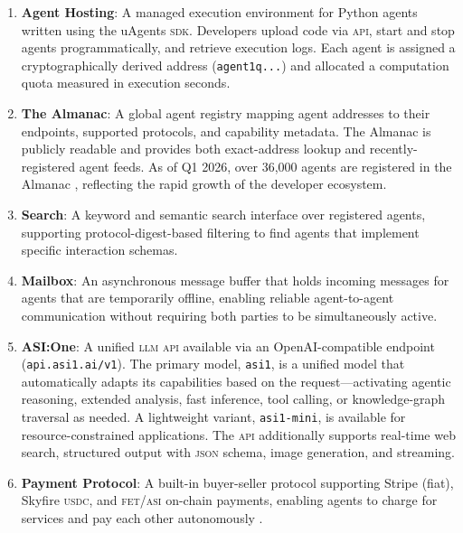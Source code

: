 \documentclass[twoside,11pt]{article}
\begin{document}
\begin{enumerate}[leftmargin=*]

\item \textbf{Agent Hosting}: A managed execution environment for Python agents
written using the uAgents \textsc{sdk}.  Developers upload code via
\textsc{api}, start and stop agents programmatically, and retrieve execution
logs.  Each agent is assigned a cryptographically derived address
(\texttt{agent1q...}) and allocated a computation quota measured in execution
seconds.

\item \textbf{The Almanac}: A global agent registry mapping agent addresses to
their endpoints, supported protocols, and capability metadata.  The Almanac is
publicly readable and provides both exact-address lookup and recently-registered
agent feeds.  As of Q1 2026, over 36,000 agents are registered in the Almanac
\citep{kantor2026stateofagents}, reflecting the rapid growth of the developer
ecosystem.

\item \textbf{Search}: A keyword and semantic search interface over registered
agents, supporting protocol-digest-based filtering to find agents that implement
specific interaction schemas.

\item \textbf{Mailbox}: An asynchronous message buffer that holds incoming
messages for agents that are temporarily offline, enabling reliable
agent-to-agent communication without requiring both parties to be simultaneously
active.

\item \textbf{ASI:One}: A unified \textsc{llm} \textsc{api} available via an
OpenAI-compatible endpoint (\texttt{api.asi1.\allowbreak{}ai/v1}).  The primary model,
\texttt{asi1}, is a unified model that automatically adapts its capabilities
based on the request---activating agentic reasoning, extended analysis, fast
inference, tool calling, or knowledge-graph traversal as needed.  A
lightweight variant, \texttt{asi1-mini}, is available for resource-constrained
applications.  The \textsc{api} additionally supports real-time web search,
structured output with \textsc{json} schema, image generation, and streaming.

\item \textbf{Payment Protocol}: A built-in buyer-seller protocol supporting
Stripe (fiat), Skyfire \textsc{usdc}, and \textsc{fet}/\textsc{asi} on-chain
payments, enabling agents to charge for services and pay each other
autonomously \citep{fetchai2026payments}.

\end{enumerate}
\end{document}
